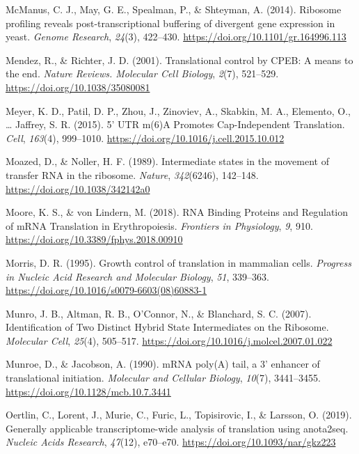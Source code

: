\documentclass[12pt,openany]{book}
\begin{document}
\hypertarget{ref-McManus2014}{}
McManus, C. J., May, G. E., Spealman, P., \& Shteyman, A. (2014).
Ribosome profiling reveals post-transcriptional buffering of divergent
gene expression in yeast. \emph{Genome Research}, \emph{24}(3),
422--430. \url{https://doi.org/10.1101/gr.164996.113}

\hypertarget{ref-Mendez2001}{}
Mendez, R., \& Richter, J. D. (2001). Translational control by CPEB: A
means to the end. \emph{Nature Reviews. Molecular Cell Biology},
\emph{2}(7), 521--529. \url{https://doi.org/10.1038/35080081}

\hypertarget{ref-Meyer2015}{}
Meyer, K. D., Patil, D. P., Zhou, J., Zinoviev, A., Skabkin, M. A.,
Elemento, O., \ldots{} Jaffrey, S. R. (2015). 5' UTR m(6)A Promotes
Cap-Independent Translation. \emph{Cell}, \emph{163}(4), 999--1010.
\url{https://doi.org/10.1016/j.cell.2015.10.012}

\hypertarget{ref-Moazed1989}{}
Moazed, D., \& Noller, H. F. (1989). Intermediate states in the movement
of transfer RNA in the ribosome. \emph{Nature}, \emph{342}(6246),
142--148. \url{https://doi.org/10.1038/342142a0}

\hypertarget{ref-Moore2018}{}
Moore, K. S., \& von Lindern, M. (2018). RNA Binding Proteins and
Regulation of mRNA Translation in Erythropoiesis. \emph{Frontiers in
Physiology}, \emph{9}, 910.
\url{https://doi.org/10.3389/fphys.2018.00910}

\hypertarget{ref-Morris1995}{}
Morris, D. R. (1995). Growth control of translation in mammalian cells.
\emph{Progress in Nucleic Acid Research and Molecular Biology},
\emph{51}, 339--363. \url{https://doi.org/10.1016/s0079-6603(08)60883-1}

\hypertarget{ref-Munro2007}{}
Munro, J. B., Altman, R. B., O'Connor, N., \& Blanchard, S. C. (2007).
Identification of Two Distinct Hybrid State Intermediates on the
Ribosome. \emph{Molecular Cell}, \emph{25}(4), 505--517.
\url{https://doi.org/10.1016/j.molcel.2007.01.022}

\hypertarget{ref-Munroe1990}{}
Munroe, D., \& Jacobson, A. (1990). mRNA poly(A) tail, a 3' enhancer of
translational initiation. \emph{Molecular and Cellular Biology},
\emph{10}(7), 3441--3455. \url{https://doi.org/10.1128/mcb.10.7.3441}

\hypertarget{ref-Oertlin2019}{}
Oertlin, C., Lorent, J., Murie, C., Furic, L., Topisirovic, I., \&
Larsson, O. (2019). Generally applicable transcriptome-wide analysis of
translation using anota2seq. \emph{Nucleic Acids Research},
\emph{47}(12), e70--e70. \url{https://doi.org/10.1093/nar/gkz223}
\end{document}
